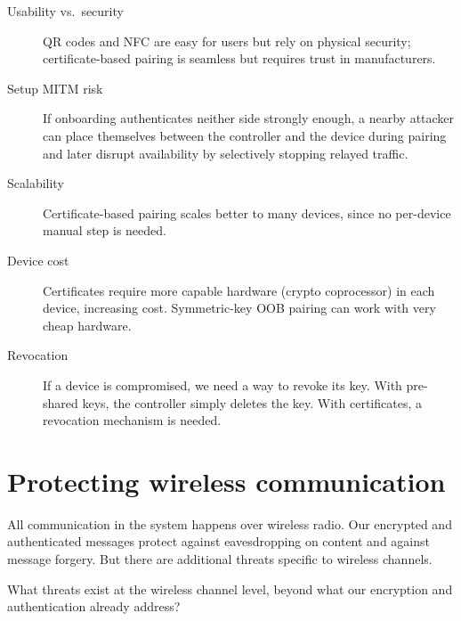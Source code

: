 \begin{description}
  \item[Usability vs.\ security] QR codes and NFC are easy for users but
    rely on physical security; certificate-based pairing is seamless but
    requires trust in manufacturers.
  \item[Setup MITM risk] If onboarding authenticates neither side strongly
    enough, a nearby attacker can place themselves between the controller and
    the device during pairing and later disrupt availability by selectively
    stopping relayed traffic.
  \item[Scalability] Certificate-based pairing scales better to many
    devices, since no per-device manual step is needed.
  \item[Device cost] Certificates require more capable hardware (crypto
    coprocessor) in each device, increasing cost.
    Symmetric-key OOB pairing can work with very cheap hardware.
  \item[Revocation] If a device is compromised, we need a way to revoke its
    key.
    With pre-shared keys, the controller simply deletes the key.
    With certificates, a revocation mechanism is needed.
\end{description}


\section{Protecting wireless communication}\label{EnergyWirelessSecurity}


All communication in the system happens over wireless radio.
Our encrypted and authenticated messages protect against eavesdropping on
content and against message forgery.
But there are additional threats specific to wireless channels.

\begin{exercise}
  What threats exist at the wireless channel level, beyond what our
  encryption and authentication already address?
\end{exercise}

